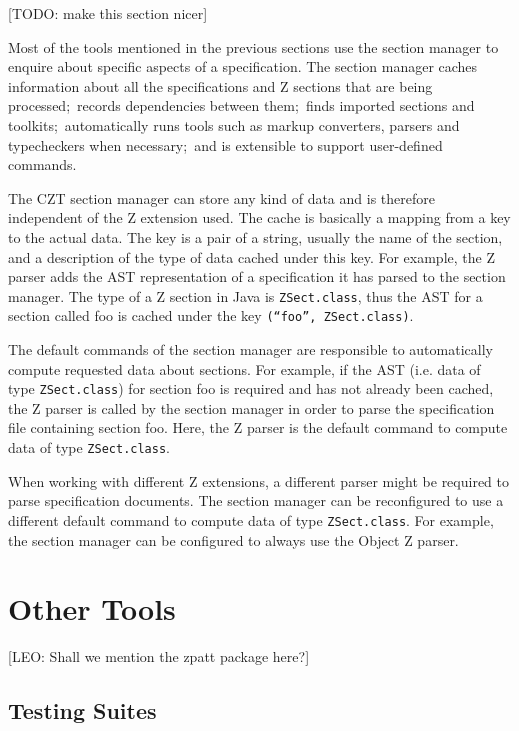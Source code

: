 \documentclass{llncs}
\newcommand{\Interface}[1]{\texttt{#1}}
\begin{document}
  [TODO: make this section nicer]

  Most of the tools mentioned in the previous sections use the section
  manager to enquire about specific aspects of a specification.  The
  section manager caches information about all the specifications and
  Z sections that are being processed;~records dependencies between
  them;~finds imported sections and toolkits;~automatically runs tools
  such as markup converters, parsers and typecheckers when necessary;~and
  is extensible to support user-defined commands.

  The CZT section manager can store any kind of data and is therefore
  independent of the Z extension used.  The cache is basically a mapping
  from a key to the actual data.  The key is a pair of a string,
  usually the name of the section, and a description of the type of
  data cached under this key.  For example, the Z parser adds the AST
  representation of a specification it has parsed to the section
  manager.  The type of a Z section in Java is
  \Interface{ZSect.class}, thus the AST for a section called foo is
  cached under the key \texttt{(``foo'',~ZSect.class)}.

  The default commands of the section manager are responsible to
  automatically compute requested data about sections. For example, if
  the AST (i.e. data of type \Interface{ZSect.class}) for section foo
  is required and has not already been cached, the Z parser is called
  by the section manager in order to parse the specification file
  containing section foo.  Here, the Z parser is the default command
  to compute data of type \Interface{ZSect.class}.

  When working with different Z extensions, a different
  parser might be required to parse specification documents.  The
  section manager can be reconfigured to use a different default
  command to compute data of type \Interface{ZSect.class}.  For
  example, the section manager can be configured to always use the
  Object Z parser.

\section{Other Tools}
\label{other-tools}

[LEO: Shall we mention the zpatt package here?]

\subsection{Testing Suites}
\end{document}
